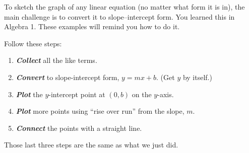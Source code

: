 \documentclass[fleqn,letterpaper,12pt,printwatermark=false]{memoir}
\begin{document}




To sketch the graph of any linear equation
(no matter what form it is in),
the main challenge is to convert it to slope--intercept form.
You learned this in Algebra 1.
These examples will remind you how to do it.

\begin{myKeyConcepts}
    Follow these steps:
    \begin{enumerate}
        \item {\bfseries\itshape Collect} all the like terms.
        \item {\bfseries\itshape Convert} to slope-intercept form, $y = mx + b$. (Get $y$ by itself.)
        \item {\bfseries\itshape Plot} the $y$-intercept point at $(0,b)$ on the $y$-axis. 
        \item {\bfseries\itshape Plot} more points using ``rise over run'' from the slope, $m$.
        \item {\bfseries\itshape Connect} the points with a straight line.
    \end{enumerate}
\end{myKeyConcepts}

Those last three steps are the same as what we just did.



\end{document}
